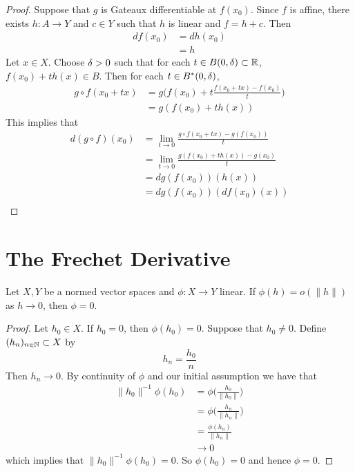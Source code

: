 \documentclass{book}
\begin{document}
	\begin{proof}
	Suppose that $g$ is Gateaux differentiable at $f(x_0)$. Since $f$ is affine, there exists $h:A \rightarrow Y$ and $c \in Y$ such that $h$ is linear and $f = h+c$. Then 
	\begin{align*}
	df(x_0) 
	&= dh(x_0) \\
	&= h
	\end{align*}
	Let $x \in X$. Choose $\delta >0$ such that for each $t \in B(0, \delta) \subset \mathbb{R}$, $f(x_0) + th(x) \in B$. Then for each $t \in B^*(0, \delta)$,
	\begin{align*}
	g \circ f(x_0 + tx)
	&= g \bigg ( f(x_0) + t \frac{f(x_0 + tx) - f(x_0)}{t} \bigg) \\
	&=  g ( f(x_0) + th(x)) 
	\end{align*}
	This implies that
	\begin{align*}
	d(g \circ f)(x_0)
	&= \lim_{t \rightarrow 0 }\frac{g \circ f (x_0 + tx) - g(f(x_0))}{t} \\  
	&= \lim_{t \rightarrow 0} \frac{g ( f(x_0) + th(x)) - g(x_0)}{t} \\
	&= dg(f(x_0))(h(x)) \\
	&= dg(f(x_0))(df(x_0)(x)) \\
	\end{align*}
	\end{proof}
	
	
	
	
	
	
	
	
	
	
	
	
	
	
	
	\newpage
	\section{The Frechet Derivative}
	
	\begin{ex} 
	Let $X,Y$ be a normed vector spaces and $\phi: X \rightarrow Y$ linear. If $\phi(h) = o(\|h\|)$ as $h \rightarrow 0$, then $\phi = 0$. 
	\end{ex}
	
	\begin{proof}
	Let $h_0 \in X$. If $h_0 = 0$, then $\phi(h_0) = 0$. Suppose that $h_0 \neq 0$. Define $(h_n)_{n \in \mathbb{N}} \subset X$ by $$h_n = \frac{h_0}{n}$$ Then $h_n \rightarrow 0$. By continuity of $\phi$ and our initial assumption we have that 
	\begin{align*}
	\| h_0 \|^{-1} \phi ( h_0 ) 
	&= \phi \bigg( \frac{h_0}{\| h_0 \|} \bigg) \\
	&= \phi \bigg( \frac{h_n}{\| h_n \|} \bigg) \\
	&= \frac{\phi(h_n)}{\| h_n \|} \\
	& \rightarrow 0
	\end{align*}
	which implies that $\| h_0 \|^{-1}\phi ( h_0 ) = 0$. So $\phi(h_0) = 0$ and hence $\phi = 0$.
	\end{proof}
	
\end{document}
